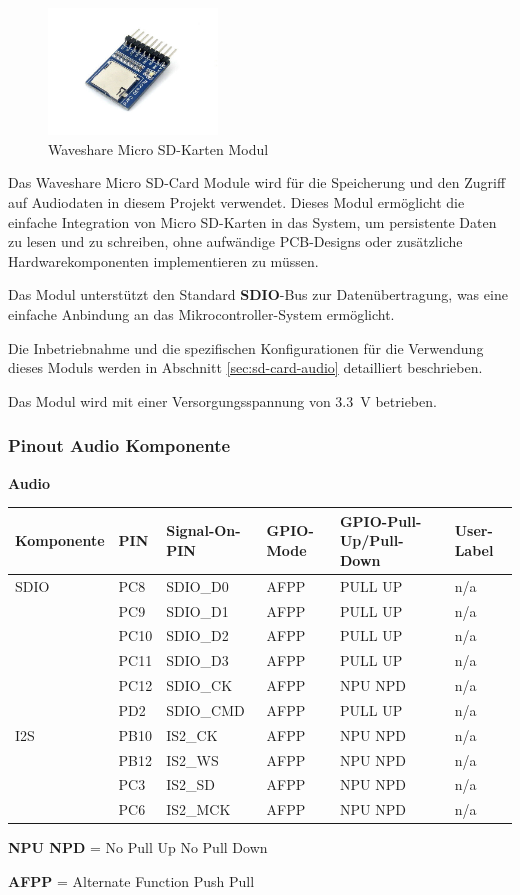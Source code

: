\begin{figure} %
	\vspace{-20pt}
	\includegraphics[width=0.4\textwidth]{images/05_technische_spezifikation/audio/waveshare_micro_sd_module.jpg}
	\caption{Waveshare Micro SD-Karten Modul}
	\label{fig:waveshare_micro_sd_module}
\end{figure}

Das Waveshare Micro SD-Card Module wird für die Speicherung und den Zugriff auf Audiodaten in diesem Projekt verwendet. Dieses Modul ermöglicht die einfache Integration von Micro SD-Karten in das System, um persistente Daten zu lesen und zu schreiben, ohne aufwändige PCB-Designs oder zusätzliche Hardwarekomponenten implementieren zu müssen.

Das Modul unterstützt den Standard \textbf{SDIO}-Bus zur Datenübertragung, was eine einfache Anbindung an das Mikrocontroller-System ermöglicht. 

Die Inbetriebnahme und die spezifischen Konfigurationen für die Verwendung dieses Moduls werden in Abschnitt \ref{sec:sd-card-audio} detailliert beschrieben. 

Das Modul wird mit einer Versorgungsspannung von \SI{3.3}{\volt} betrieben.

\newpage
\subsubsection{Pinout Audio Komponente}

\textbf{Audio}
\begin{longtable}[c]{|p{2.5cm}|p{1cm}|p{2.5cm}|p{2.5cm}|p{2.5cm}|p{3cm}|}
	\hline
	\textbf{Komponente} & \textbf{PIN} & \textbf{Signal-On-PIN} &  \textbf{GPIO-Mode} & \textbf{GPIO-Pull-Up/Pull-Down } & \textbf{User-Label}\\
	\hline
	SDIO & PC8 & SDIO\_D0 & AFPP & PULL UP & n/a \\
	\hline
	& PC9 & SDIO\_D1 & AFPP & PULL UP & n/a \\
	\hline
	& PC10 & SDIO\_D2 & AFPP & PULL UP & n/a \\
	\hline
	& PC11 & SDIO\_D3 & AFPP & PULL UP & n/a \\
	\hline
	& PC12 & SDIO\_CK & AFPP & NPU NPD & n/a \\
	\hline
	& PD2 & SDIO\_CMD & AFPP & PULL UP & n/a \\
	\hline
	I2S & PB10 & IS2\_CK & AFPP  & NPU NPD & n/a \\
	\hline
	& PB12 & IS2\_WS & AFPP & NPU NPD & n/a \\
	\hline
	& PC3 & IS2\_SD & AFPP & NPU NPD &  n/a \\
	\hline
	& PC6 & IS2\_MCK & AFPP & NPU NPD &  n/a \\
	\hline
\end{longtable}

\textbf{NPU NPD} = No Pull Up No Pull Down		

\textbf{AFPP} = Alternate Function Push Pull 

